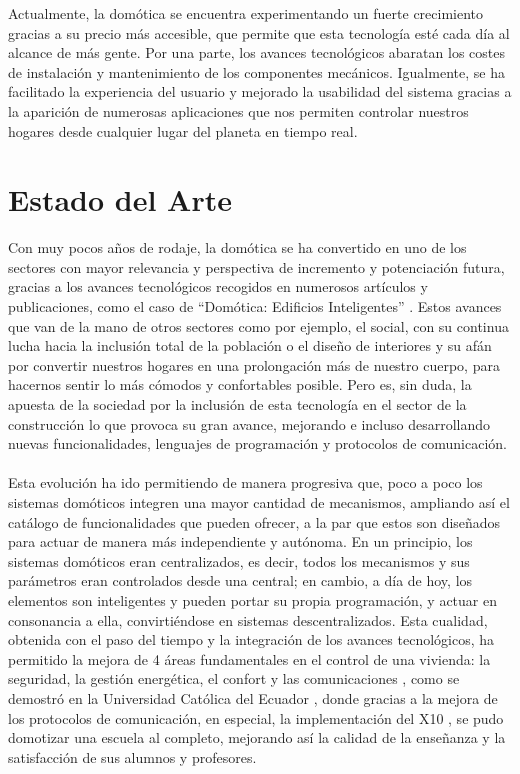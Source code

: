Actualmente, la domótica se encuentra experimentando un fuerte crecimiento gracias a su precio más accesible, que permite que esta tecnología esté cada día al alcance de más gente. Por una parte, los avances tecnológicos abaratan los costes de instalación y mantenimiento de los componentes mecánicos. Igualmente, se ha facilitado la experiencia del usuario y mejorado la usabilidad del sistema gracias a la aparición de numerosas aplicaciones que nos permiten controlar nuestros hogares desde cualquier lugar del planeta en tiempo real. 


\section{Estado del Arte}
Con muy pocos años de rodaje, la domótica se ha convertido en uno de los sectores con mayor relevancia y perspectiva de incremento y potenciación futura, gracias a los avances tecnológicos recogidos en numerosos artículos y publicaciones, como el caso de “Domótica: Edificios Inteligentes” \cite{EI:2004}. Estos avances que van de la mano de otros sectores como por ejemplo, el social, con su continua lucha hacia la inclusión total de la población o el diseño de interiores y su afán por convertir nuestros hogares en una prolongación más de nuestro cuerpo, para hacernos sentir lo más cómodos y confortables posible. Pero es, sin duda, la apuesta de la sociedad por la inclusión de esta tecnología en el sector de la construcción lo que provoca su gran avance, mejorando e incluso desarrollando nuevas funcionalidades, lenguajes de programación y protocolos de comunicación.\\\\

Esta evolución ha ido permitiendo de manera progresiva que, poco a poco los sistemas domóticos integren una mayor cantidad de mecanismos, ampliando así el catálogo de funcionalidades que pueden ofrecer, a la par que estos son diseñados para actuar de manera más independiente y autónoma. En un principio, los sistemas domóticos eran centralizados, es decir, todos los mecanismos y sus parámetros eran controlados desde una central; en cambio, a día de hoy, los elementos son inteligentes y pueden portar su propia programación, y actuar en consonancia a ella, convirtiéndose en sistemas descentralizados. Esta cualidad, obtenida con el paso del tiempo y la integración de los avances tecnológicos, ha permitido la mejora de 4 áreas fundamentales en el control de una vivienda: la seguridad, la gestión energética, el confort y las comunicaciones  \cite{Andes:2011}, como se demostró en la Universidad Católica del Ecuador \cite{Ecuador:2017}, donde gracias a la mejora de los protocolos de comunicación, en especial, la implementación del X10 \cite{esther:2009}, se pudo domotizar una escuela al completo, mejorando así la calidad de la enseñanza y la satisfacción de sus alumnos y profesores.\\\\

